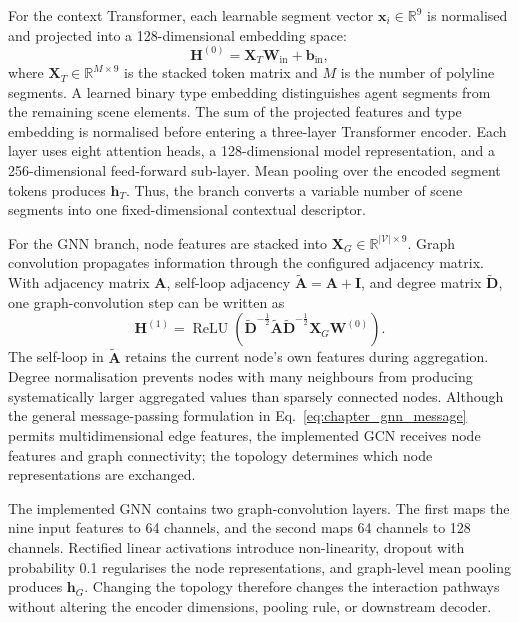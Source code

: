 For the context Transformer, each learnable segment vector \(\mathbf{x}_i\in\mathbb{R}^{9}\) is normalised and projected into a 128-dimensional embedding space:
\begin{equation}
    \mathbf{H}^{(0)} =
    \mathbf{X}_T\mathbf{W}_{\mathrm{in}}+\mathbf{b}_{\mathrm{in}},
    \label{eq:chapter_transformer_projection}
\end{equation}
where \(\mathbf{X}_T\in\mathbb{R}^{M\times 9}\) is the stacked token matrix and \(M\) is the number of polyline segments. A learned binary type embedding distinguishes agent segments from the remaining scene elements. The sum of the projected features and type embedding is normalised before entering a three-layer Transformer encoder. Each layer uses eight attention heads, a 128-dimensional model representation, and a 256-dimensional feed-forward sub-layer. Mean pooling over the encoded segment tokens produces \(\mathbf{h}_T\). Thus, the branch converts a variable number of scene segments into one fixed-dimensional contextual descriptor.

For the GNN branch, node features are stacked into \(\mathbf{X}_G\in\mathbb{R}^{|\mathcal{V}|\times 9}\). Graph convolution propagates information through the configured adjacency matrix. With adjacency matrix \(\mathbf{A}\), self-loop adjacency \(\tilde{\mathbf{A}}=\mathbf{A}+\mathbf{I}\), and degree matrix \(\tilde{\mathbf{D}}\), one graph-convolution step can be written as
\begin{equation}
\mathbf{H}^{(1)}
=
\operatorname{ReLU}
\left(
\tilde{\mathbf{D}}^{-\frac{1}{2}}
\tilde{\mathbf{A}}
\tilde{\mathbf{D}}^{-\frac{1}{2}}
\mathbf{X}_G
\mathbf{W}^{(0)}
\right).
\label{eq:chapter_gnn_layer}
\end{equation}
The self-loop in \(\tilde{\mathbf{A}}\) retains the current node's own features during aggregation. Degree normalisation prevents nodes with many neighbours from producing systematically larger aggregated values than sparsely connected nodes. Although the general message-passing formulation in Eq.~\ref{eq:chapter_gnn_message} permits multidimensional edge features, the implemented GCN receives node features and graph connectivity; the topology determines which node representations are exchanged.

The implemented GNN contains two graph-convolution layers. The first maps the nine input features to 64 channels, and the second maps 64 channels to 128 channels. Rectified linear activations introduce non-linearity, dropout with probability 0.1 regularises the node representations, and graph-level mean pooling produces \(\mathbf{h}_G\). Changing the topology therefore changes the interaction pathways without altering the encoder dimensions, pooling rule, or downstream decoder.


